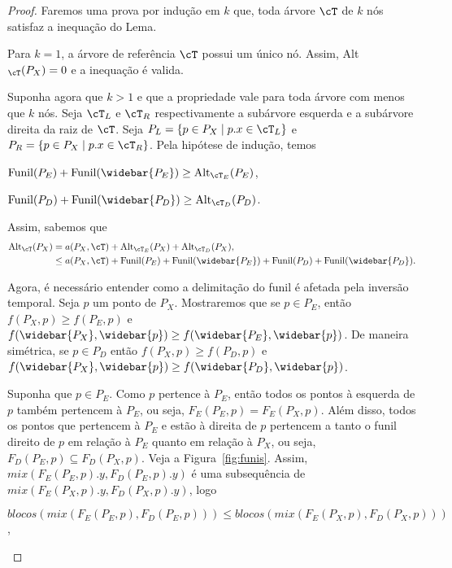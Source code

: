 \begin{proof}
    Faremos uma prova por indução em $k$ que, toda árvore $\cT$ de $k$ nós satisfaz a inequação do Lema.

    Para $k = 1$, a árvore de referência $\cT$ possui um único nó. Assim, Alt$_{\cT}(P_X) = 0$ e a inequação é valida.

    Suponha agora que $k > 1$ e que a propriedade vale para toda árvore com menos que $k$ nós. Seja $\cT_{L}$ e $\cT_{R}$ respectivamente a subárvore esquerda e a subárvore direita da raiz de $\cT$. Seja $P_L = \{p \in P_X \mid p.x \in \cT_L\}$ e $P_R = \{p \in P_X \mid p.x \in \cT_R\}$. Pela hipótese de indução, temos
    \begin{center}
    $\text{Funil}(P_E) +  \text{Funil}(\widebar{P_E}) \geq  \text{Alt}_{\cT_E}(P_E)$,

    $\text{Funil}(P_D) +  \text{Funil}(\widebar{P_D}) \geq  \text{Alt}_{\cT_D}(P_D)$.
    \end{center}
    Assim, sabemos que 
    \begin{align}
        \text{Alt}_{\cT}(P_X) &= a(P_X,\cT) + \text{Alt}_{\cT_E}(P_X) + \text{Alt}_{\cT_D}(P_X), \notag \\
        &\leq a(P_X,\cT) + \text{Funil}(P_E) +  \text{Funil}(\widebar{P_E}) + \text{Funil}(P_D) +  \text{Funil}(\widebar{P_D}). \label{eq:inicio}
    \end{align}

    Agora, é necessário entender como a delimitação do funil é afetada pela inversão temporal.
    Seja $p$ um ponto de $P_X$. Mostraremos que se $p \in P_E$, então $f(P_X,p) \geq f(P_E,p)$ e $f(\widebar{P_X},\widebar{p}) \geq f(\widebar{P_E},\widebar{p})$. De maneira simétrica, se $p \in P_D$ então $f(P_X,p) \geq f(P_D,p)$ e $f(\widebar{P_X},\widebar{p}) \geq f(\widebar{P_D},\widebar{p})$.

    Suponha que $p \in P_E$. Como $p$ pertence à $P_E$, então todos os pontos à esquerda de $p$ também pertencem à $P_E$, ou seja, $F_E(P_E,p) = F_E(P_X,p)$. Além disso, todos os pontos que pertencem à $P_E$ e estão à direita de $p$ pertencem a tanto o funil direito de $p$ em relação à $P_E$ quanto em relação à $P_X$, ou seja, $F_D(P_E,p) \subseteq F_D(P_X,p)$. Veja a Figura~\ref{fig:funis}. Assim, $mix(F_E(P_E,p).y,F_D(P_E,p).y)$ é uma subsequência de $mix(F_E(P_X,p).y,F_D(P_X,p).y)$, logo 

    \begin{center}
        $blocos(mix(F_E(P_E,p), F_D(P_E,p))) \leq blocos(mix(F_E(P_X,p), F_D(P_X,p)))$,


\end{center}
\end{proof}
